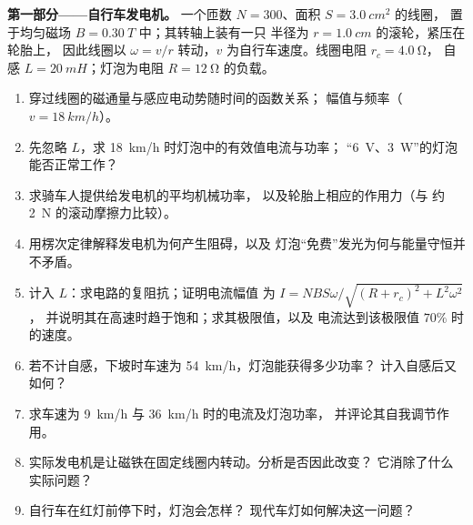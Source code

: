 \begin{problem}
\label{pb:b1:induction:1}

\medskip
\noindent\textbf{第一部分——自行车发电机。}
一个匝数 $N = 300$、面积 $S = \qty{3.0}{cm^2}$ 的线圈，
置于均匀磁场 $B = \qty{0.30}{T}$ 中；其转轴上装有一只
半径为 $r = \qty{1.0}{cm}$ 的滚轮，紧压在轮胎上，
因此线圈以 $\omega = v/r$ 转动，$v$ 为自行车速度。线圈电阻 $r_c = \qty{4.0}{\ohm}$，
自感 $L = \qty{20}{mH}$；灯泡为电阻 $R = \qty{12}{\ohm}$ 的负载。
\begin{enumerate}
  \item 穿过线圈的磁通量与感应电动势随时间的函数关系；
        幅值与频率（$v = \qty{18}{km/h}$）。
  \item 先忽略 $L$，求 \qty{18}{km/h} 时灯泡中的有效值电流与功率；
        “\qty{6}{V}、\qty{3}{W}”的灯泡能否正常工作？
  \item 求骑车人提供给发电机的平均机械功率，
        以及轮胎上相应的作用力（与
        约 \qty{2}{N} 的滚动摩擦力比较）。
  \item 用楞次定律解释发电机为何产生阻碍，以及
        灯泡“免费”发光为何与能量守恒并不矛盾。
  \item 计入 $L$：求电路的复阻抗；证明电流幅值
        为 $I = NBS\omega/\sqrt{(R + r_c)^2 + L^2\omega^2}$，
        并说明其在高速时趋于饱和；求其极限值，以及
        电流达到该极限值 $70\%$ 时的速度。
  \item 若不计自感，下坡时车速为 \qty{54}{km/h}，灯泡能获得多少功率？
        计入自感后又如何？
  \item 求车速为 \qty{9}{km/h} 与 \qty{36}{km/h} 时的电流及灯泡功率，
        并评论其自我调节作用。
  \item 实际发电机是让磁铁在固定线圈内转动。分析是否因此改变？
        它消除了什么实际问题？
  \item 自行车在红灯前停下时，灯泡会怎样？
        现代车灯如何解决这一问题？
\end{enumerate}


\end{problem}
